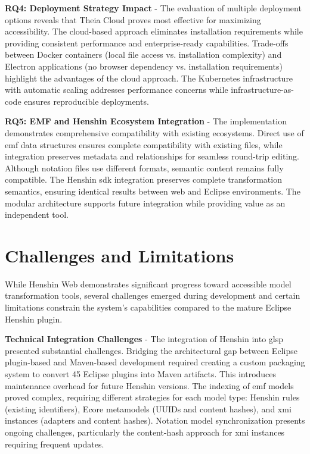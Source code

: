   \textbf{RQ4: Deployment Strategy Impact} - The evaluation of multiple deployment options reveals that Theia Cloud proves most effective for maximizing accessibility. The cloud-based approach eliminates installation requirements while providing consistent performance and enterprise-ready capabilities. Trade-offs between Docker containers (local file access vs. installation complexity) and Electron applications (no browser dependency vs. installation requirements) highlight the advantages of the cloud approach. The Kubernetes infrastructure with automatic scaling addresses performance concerns while infrastructure-as-code ensures reproducible deployments.

  \textbf{RQ5: EMF and Henshin Ecosystem Integration} - The implementation demonstrates comprehensive compatibility with existing ecosystems. Direct use of \ac{emf} data structures ensures complete compatibility with existing files, while  integration preserves metadata and relationships for seamless round-trip editing. Although notation files use different formats, semantic content remains fully compatible. The Henshin \ac{sdk} integration preserves complete transformation semantics, ensuring identical results between web and Eclipse environments. The modular architecture supports future integration while providing value as an independent tool.

  \section{Challenges and Limitations}
  \label{subsec:challenges-limitations}

  While Henshin Web demonstrates significant progress toward accessible model transformation tools, several challenges emerged during development and certain limitations constrain the system's capabilities compared to the mature Eclipse Henshin plugin.

  \textbf{Technical Integration Challenges} - The integration of Henshin into \ac{glsp} presented substantial challenges. Bridging the architectural gap between Eclipse plugin-based and Maven-based development required creating a custom packaging system to convert 45 Eclipse plugins into Maven artifacts. This introduces maintenance overhead for future Henshin versions. The indexing of \ac{emf} models proved complex, requiring different strategies for each model type: Henshin rules (existing identifiers), Ecore metamodels (UUIDs and content hashes), and \ac{xmi} instances (adapters and content hashes). Notation model synchronization presents ongoing challenges, particularly the content-hash approach for \ac{xmi} instances requiring frequent updates.

